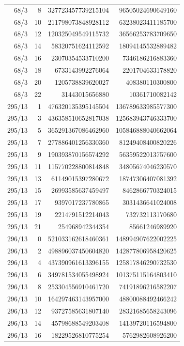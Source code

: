 \begin{longtable}{@{}rrrr@{}}
68/3 & 8 & 327723457739215104 & 96505024690649160\\
68/3 & 10 & 211798073848928112 & 63238023411185700\\
68/3 & 12 & 120325049549115732 & 36566253783709650\\
68/3 & 14 & 58320751624112592 & 18094145532889482\\
68/3 & 16 & 23070354533710200 & 7346186216883360\\
68/3 & 18 & 6733143992276064 & 2201704633178820\\
68/3 & 20 & 1205738839620027 & 408380110300800\\
68/3 & 22 & 31443015656880 & 10361710082142\\
295/13 & 1 & 476320135395145504 & 136789633985577300\\
295/13 & 3 & 436358510652817038 & 125683943746333700\\
295/13 & 5 & 365291367086462960 & 105846888040662064\\
295/13 & 7 & 277886401256330360 & 81249408400820226\\
295/13 & 9 & 190393870156574292 & 56359522013757600\\
295/13 & 11 & 115770228800814848 & 34805674046230570\\
295/13 & 13 & 61149015397280672 & 18747306407081392\\
295/13 & 15 & 26993585637459497 & 8462866770324015\\
295/13 & 17 & 9397017237780865 & 3031436641024008\\
295/13 & 19 & 2214791512214043 & 732732113170680\\
295/13 & 21 & 254968942344354 & 85661246989920\\
296/13 & 0 & 521033162618460361 & 148994907622002225\\
296/13 & 2 & 498896037450604820 & 142877806958420625\\
296/13 & 4 & 437390961613396155 & 125817846290732530\\
296/13 & 6 & 349781534055498924 & 101375115164803410\\
296/13 & 8 & 253304556910461720 & 74191896216582207\\
296/13 & 10 & 164297463143957000 & 48800088492466242\\
296/13 & 12 & 93727585631807140 & 28321685658243096\\
296/13 & 14 & 45798688549203408 & 14139720116594800\\
296/13 & 16 & 18229526810775254 & 5762982608926200\\

\end{longtable}
